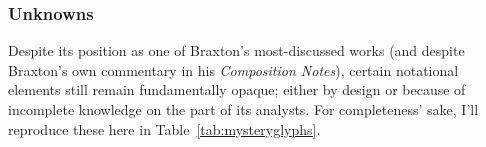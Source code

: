 
    \subsubsection{Unknowns}

        Despite its position as one of Braxton's most-discussed works (and despite Braxton's own commentary in his \textit{Composition Notes}), certain notational elements still remain fundamentally opaque; either by design or because of incomplete knowledge on the part of its analysts. For completeness' sake, I'll reproduce these here in Table~\ref{tab:mysteryglyphs}.


